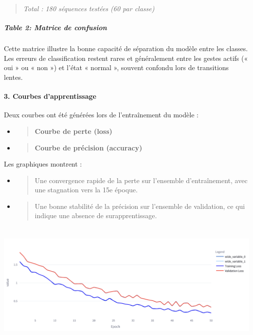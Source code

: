 \documentclass[
]{article}
\begin{document}
\begin{quote}
\emph{Total : 180 séquences testées (60 par classe)}
\end{quote}

\hypertarget{table-2-matrice-de-confusion}{%
\subparagraph{Table 2: Matrice de confusion}\label{table-2-matrice-de-confusion}}

Cette matrice illustre la bonne capacité de séparation du modèle entre les classes. Les erreurs de classification restent rares et généralement entre les gestes actifs (« oui » ou « non ») et l'état « normal », souvent confondu lors de transitions lentes.

\hypertarget{courbes-dapprentissage}{%
\paragraph{\texorpdfstring{\textbf{3. Courbes d'apprentissage}}{3. Courbes d'apprentissage}}\label{courbes-dapprentissage}}

Deux courbes ont été générées lors de l'entraînement du modèle :

\begin{itemize}
\item
  \begin{quote}
  \textbf{Courbe de perte (loss)\\
  }
  \end{quote}
\item
  \begin{quote}
  \textbf{Courbe de précision (accuracy)\\
  }
  \end{quote}
\end{itemize}

Les graphiques montrent :

\begin{itemize}
\item
  \begin{quote}
  Une convergence rapide de la perte sur l'ensemble d'entraînement, avec une stagnation vers la 15e époque.
  \end{quote}
\item
  \begin{quote}
  Une bonne stabilité de la précision sur l'ensemble de validation, ce qui indique une absence de surapprentissage.
  \end{quote}
\end{itemize}

\includegraphics[width=6.5in,height=2.45833in]{229856a5-a882-4d96-8360-24911cd95538_media/media/image4.png}
\end{document}
